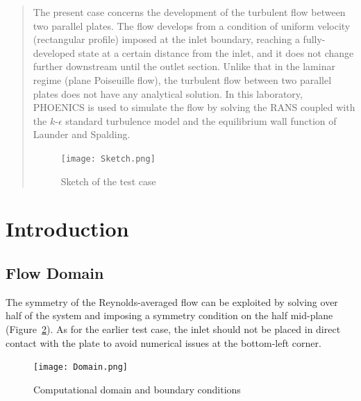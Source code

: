 \documentclass[12pt]{article}
\begin{document}
\maketitle

\begin{abstract}
        The present case concerns the development of the turbulent flow between two parallel plates. The flow develops from a condition of uniform velocity (rectangular profile) imposed at the inlet boundary, reaching a fully-developed state at a certain distance from the inlet, and it does not change further downstream until the outlet section. Unlike that in the laminar regime (plane Poiseuille flow), the turbulent flow between two parallel plates does not have any analytical solution. In this laboratory, PHOENICS is used to simulate the flow by solving the RANS coupled with the \( k \text{-} \epsilon\) standard turbulence model and the equilibrium wall function of Launder and Spalding. \cite{FL:03}

        \begin{figure}[ht!]
                \centering
                \texttt{[image: Sketch.png]}
                \caption{Sketch of the test case}
                \label{fig:sketch}
        \end{figure}

\end{abstract}

\section{Introduction}
        \subsection{Flow Domain}

                The symmetry of the Reynolds-averaged flow can be exploited by solving over half of the system and imposing a symmetry condition on the half mid-plane (Figure~\ref{fig:domain}). As for the earlier test case, the inlet should not be placed in direct contact with the plate to avoid numerical issues at the bottom-left corner.

                \begin{figure}[ht!]
                        \centering
                        \texttt{[image: Domain.png]}
                        \caption{Computational domain and boundary conditions}
                        \label{fig:domain}
                \end{figure}
\end{document}
